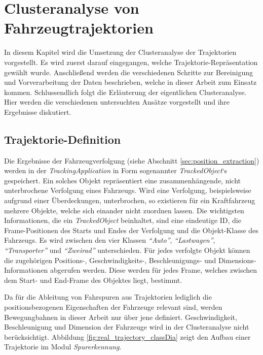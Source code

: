 
\chapter{Clusteranalyse von Fahrzeugtrajektorien}
\label{cha:realisation_clustering}

In diesem Kapitel wird die Umsetzung der Clusteranalyse der Trajektorien vorgestellt.
Es wird zuerst darauf eingegangen, welche Trajektorie-Repräsentation gewählt wurde. Anschließend
werden die verschiedenen Schritte zur Bereinigung und Vorverarbeitung der Daten beschrieben, welche
in dieser Arbeit zum Einsatz kommen. Schlussendlich folgt die Erläuterung der eigentlichen Clusteranalyse.
Hier werden die verschiedenen untersuchten Ansätze vorgestellt und ihre Ergebnisse diskutiert.

\section{Trajektorie-Definition}

Die Ergebnisse der Fahrzeugverfolgung (siehe Abschnitt \ref{sec:position_extraction}) werden
in der \textit{TrackingApplication} in Form sogenannter \textit{TrackedObject}`s gespeichert.
Ein solches Objekt repräsentiert eine zusammenhängende, nicht unterbrochene Verfolgung eines Fahrzeugs.
Wird eine Verfolgung, beispielsweise aufgrund einer Überdeckungen, unterbrochen, so existieren für ein
Kraftfahrzeug mehrere Objekte, welche sich einander nicht zuordnen lassen.
Die wichtigsten Informationen, die ein \textit{TrackedObject} beinhaltet, sind eine eindeutige ID,
die Frame-Positionen des Starts und Endes der Verfolgung und die Objekt-Klasse des Fahrzeugs. Es wird
zwischen den vier Klassen \textit{``Auto''}, \textit{``Lastwagen''}, \textit{``Transporter''}
und \textit{``Zweirad''} unterschieden.
Für jedes verfolgte Objekt können die zugehörigen Positions-, Geschwindigkeits-, Beschleunigungs-
und Dimensions-Informationen abgerufen werden. Diese werden für jedes Frame, welches zwischen dem Start-
und End-Frame des Objektes liegt, bestimmt.

Da für die Ableitung von Fahrspuren aus Trajektorien lediglich die positionsbezogenen Eigenschaften
der Fahrzeuge relevant sind, werden Bewegungbahnen in dieser Arbeit nur über jene definiert.
Geschwindigkeit, Beschleunigung und Dimension der Fahrzeuge wird in der Clusteranalyse nicht berücksichtigt.
Abbildung \ref{fig:real_trajectory_classDia} zeigt den Aufbau einer Trajektorie im Modul \textit{Spurerkennung}.

